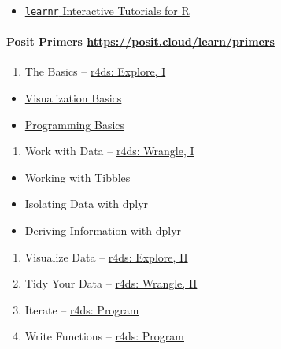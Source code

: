 \documentclass[
]{article}
\providecommand{\tightlist}{%
  \setlength{\itemsep}{0pt}\setlength{\parskip}{0pt}}
\begin{document}
\begin{itemize}
\tightlist
\item
  \href{https://rstudio.github.io/learnr/index.html}{\texttt{learnr}
  Interactive Tutorials for R}
\end{itemize}

\hypertarget{posit-primers-httpsposit.cloudlearnprimers}{%
\paragraph{\texorpdfstring{Posit Primers
\url{https://posit.cloud/learn/primers}}{Posit Primers https://posit.cloud/learn/primers}}\label{posit-primers-httpsposit.cloudlearnprimers}}

\begin{enumerate}
\def\labelenumi{\arabic{enumi}.}
\tightlist
\item
  The Basics --
  \href{https://r4ds.had.co.nz/explore-intro.html\#explore-intro}{r4ds:
  Explore, I}
\end{enumerate}

\begin{itemize}
\tightlist
\item
  \href{https://rstudio.cloud/learn/primers/1.1}{Visualization Basics}
\item
  \href{https://rstudio.cloud/learn/primers/1.2}{Programming Basics}
\end{itemize}

\begin{enumerate}
\def\labelenumi{\arabic{enumi}.}
\setcounter{enumi}{1}
\tightlist
\item
  Work with Data --
  \href{https://r4ds.had.co.nz/wrangle-intro.html\#wrangle-intro}{r4ds:
  Wrangle, I}
\end{enumerate}

\begin{itemize}
\tightlist
\item
  Working with Tibbles
\item
  Isolating Data with dplyr
\item
  Deriving Information with dplyr
\end{itemize}

\begin{enumerate}
\def\labelenumi{\arabic{enumi}.}
\setcounter{enumi}{2}
\tightlist
\item
  Visualize Data --
  \href{https://r4ds.had.co.nz/explore-intro.html\#explore-intro}{r4ds:
  Explore, II}
\item
  Tidy Your Data --
  \href{https://r4ds.had.co.nz/wrangle-intro.html\#wrangle-intro}{r4ds:
  Wrangle, II}
\item
  Iterate --
  \href{https://r4ds.had.co.nz/program-intro.html\#program-intro}{r4ds:
  Program}
\item
  Write Functions --
  \href{https://r4ds.had.co.nz/program-intro.html\#program-intro}{r4ds:
  Program}
\end{enumerate}
\end{document}
